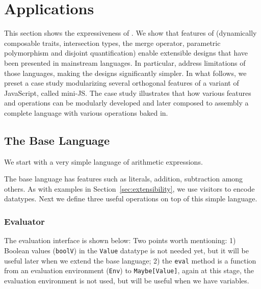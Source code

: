 \section{Applications}


This section shows the expressiveness of \name. We show that features of \name
(dynamically composable traits, intersection types, the merge operator,
parametric polymorphism and disjoint quantification) enable extensible designs
that have been presented in mainstream languages. In particular, \name address
limitations of those languages, making the designs significantly simpler. In
what follows, we preset a case study modularizing several orthogonal features of
a variant of JavaScript, called mini-JS. The case study illustrates that how
various features and operations can be modularly developed and later composed to
assembly a complete language with various operations baked in.

\subsection{The Base Language}

We start with a very simple language of arithmetic expressions.

The base language has features such as literals, addition, subtraction among
others. As with examples in Section~\ref{sec:extensibility}, we use visitors to
encode datatypes. Next we define three useful operations on top of this simple
language.

\subsubsection{Evaluator}

The evaluation interface is shown below:
Two points worth mentioning: 1) Boolean values (\lstinline{boolV}) in the
\lstinline{Value} datatype is not needed yet, but it will be useful later when
we extend the base language; 2) the \lstinline{eval} method is a function from
an evaluation environment (\lstinline{Env}) to \lstinline{Maybe[Value]}, again
at this stage, the evaluation environment is not used, but will be useful when
we have variables.

